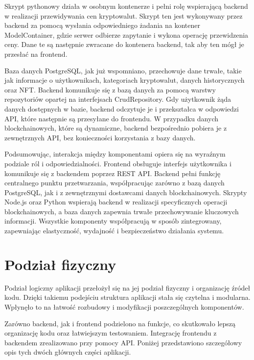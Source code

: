 Skrypt pythonowy działa w osobnym kontenerze i pełni rolę wspierającą backend w realizacji przewidywania cen kryptowalut. Skrypt ten jest wykonywany przez backend za pomocą wysłania odpowiedniego żadania na kontener ModelContainer, gdzie serwer odbierze zapytanie i wykona operację przewidzenia ceny. Dane te są następnie zwracane do kontenera backend, tak aby ten mógł je przesłać na frontend.

Baza danych PostgreSQL, jak już wspomniano, przechowuje dane trwałe, takie jak informacje o użytkownikach, kategoriach kryptowalut, danych historycznych oraz NFT. Backend komunikuje się z bazą danych za pomocą warstwy repozytoriów opartej na interfejsach CrudRepository. Gdy użytkownik żąda danych dostępnych w bazie, backend odczytuje je i przekształca w odpowiedzi API, które następnie są przesyłane do frontendu. W przypadku danych blockchainowych, które są dynamiczne, backend bezpośrednio pobiera je z zewnętrznych API, bez konieczności korzystania z bazy danych.

Podsumowując, interakcja między komponentami opiera się na wyraźnym podziale ról i odpowiedzialności. Frontend obsługuje interfejs użytkownika i komunikuje się z backendem poprzez REST API. Backend pełni funkcję centralnego punktu przetwarzania, współpracując zarówno z bazą danych PostgreSQL, jak i z zewnętrznymi dostawcami danych blockchainowych. Skrypty Node.js oraz Python wspierają backend w realizacji specyficznych operacji blockchainowych, a baza danych zapewnia trwałe przechowywanie kluczowych informacji. Wszystkie komponenty współpracują w sposób zintegrowany, zapewniając elastyczność, wydajność i bezpieczeństwo działania systemu.

\section{Podział fizyczny}
Podział logiczny aplikacji przełożył się na jej podział fizyczny i organizację źródeł kodu. Dzięki takiemu podejściu struktura aplikacji stała się czytelna i modularna. Wpłynęło to na łatwość rozbudowy i modyfikacji poszczególnych komponentów. 

Zarówno backend, jak i frontend podzielono na funkcje, co skutkowało lepszą organizację kodu oraz łatwiejszym testowaniem. Integrację frontendu z backendem zrealizowano przy pomocy API. Poniżej przedstawiono szczegółowy opis tych dwóch głównych części aplikacji.

